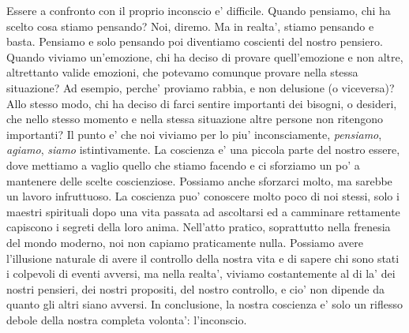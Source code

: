 Essere a confronto con il proprio inconscio e' difficile. 
Quando pensiamo, chi ha scelto cosa stiamo pensando? Noi, diremo. Ma in realta', stiamo pensando e basta. Pensiamo e solo pensando poi diventiamo coscienti del nostro pensiero.
Quando viviamo un'emozione, chi ha deciso di provare quell'emozione e non altre, altrettanto valide emozioni, che potevamo comunque provare nella stessa situazione? Ad esempio, perche' proviamo rabbia, e non delusione (o viceversa)?
Allo stesso modo, chi ha deciso di farci sentire importanti dei bisogni, o desideri, che nello stesso momento e nella stessa situazione altre persone non ritengono importanti? Il punto e' che noi viviamo per lo piu' inconsciamente, \emph{pensiamo}, \emph{agiamo}, \emph{siamo} istintivamente. La coscienza e' una piccola parte del nostro essere, dove mettiamo a vaglio quello che stiamo facendo e ci sforziamo un po' a mantenere delle scelte coscienziose. Possiamo anche sforzarci molto, ma sarebbe un lavoro infruttuoso. La coscienza puo' conoscere molto poco di noi stessi, solo i maestri spirituali dopo una vita passata ad ascoltarsi ed a camminare rettamente capiscono i segreti della loro anima. Nell'atto pratico, soprattutto nella frenesia del mondo moderno, noi non capiamo praticamente nulla. Possiamo avere l'illusione naturale di avere il controllo della nostra vita e di sapere chi sono stati i colpevoli di eventi avversi, ma nella realta', viviamo costantemente al di la' dei nostri pensieri, dei nostri propositi, del nostro controllo, e cio' non dipende da quanto gli altri siano avversi. In conclusione, la nostra coscienza e' solo un riflesso debole della nostra completa volonta': l'inconscio.

